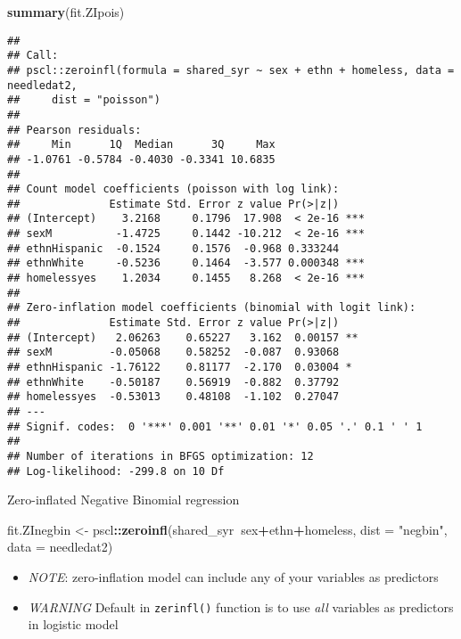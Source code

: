 \documentclass[
  ignorenonframetext,
]{beamer}
\newenvironment{Shaded}{\begin{snugshade}}{\end{snugshade}}
\newcommand{\DataTypeTok}[1]{\textcolor[rgb]{0.13,0.29,0.53}{#1}}
\newcommand{\KeywordTok}[1]{\textcolor[rgb]{0.13,0.29,0.53}{\textbf{#1}}}
\newcommand{\NormalTok}[1]{#1}
\newcommand{\OperatorTok}[1]{\textcolor[rgb]{0.81,0.36,0.00}{\textbf{#1}}}
\newcommand{\StringTok}[1]{\textcolor[rgb]{0.31,0.60,0.02}{#1}}
\providecommand{\tightlist}{%
  \setlength{\itemsep}{0pt}\setlength{\parskip}{0pt}}
\begin{document}
\begin{frame}[fragile]{}
\protect\hypertarget{section-1}{}

\tiny

\begin{Shaded}
\begin{Highlighting}[]
\KeywordTok{summary}\NormalTok{(fit.ZIpois)}
\end{Highlighting}
\end{Shaded}

\begin{verbatim}
## 
## Call:
## pscl::zeroinfl(formula = shared_syr ~ sex + ethn + homeless, data = needledat2, 
##     dist = "poisson")
## 
## Pearson residuals:
##     Min      1Q  Median      3Q     Max 
## -1.0761 -0.5784 -0.4030 -0.3341 10.6835 
## 
## Count model coefficients (poisson with log link):
##              Estimate Std. Error z value Pr(>|z|)    
## (Intercept)    3.2168     0.1796  17.908  < 2e-16 ***
## sexM          -1.4725     0.1442 -10.212  < 2e-16 ***
## ethnHispanic  -0.1524     0.1576  -0.968 0.333244    
## ethnWhite     -0.5236     0.1464  -3.577 0.000348 ***
## homelessyes    1.2034     0.1455   8.268  < 2e-16 ***
## 
## Zero-inflation model coefficients (binomial with logit link):
##              Estimate Std. Error z value Pr(>|z|)   
## (Intercept)   2.06263    0.65227   3.162  0.00157 **
## sexM         -0.05068    0.58252  -0.087  0.93068   
## ethnHispanic -1.76122    0.81177  -2.170  0.03004 * 
## ethnWhite    -0.50187    0.56919  -0.882  0.37792   
## homelessyes  -0.53013    0.48108  -1.102  0.27047   
## ---
## Signif. codes:  0 '***' 0.001 '**' 0.01 '*' 0.05 '.' 0.1 ' ' 1 
## 
## Number of iterations in BFGS optimization: 12 
## Log-likelihood: -299.8 on 10 Df
\end{verbatim}

\end{frame}

\begin{frame}[fragile]{Zero-inflated Negative Binomial regression}
\protect\hypertarget{zero-inflated-negative-binomial-regression}{}

\begin{Shaded}
\begin{Highlighting}[]
\NormalTok{fit.ZInegbin <-}\StringTok{ }
\StringTok{  }\NormalTok{pscl}\OperatorTok{::}\KeywordTok{zeroinfl}\NormalTok{(shared_syr}\OperatorTok{~}\NormalTok{sex}\OperatorTok{+}\NormalTok{ethn}\OperatorTok{+}\NormalTok{homeless,}
                         \DataTypeTok{dist =} \StringTok{"negbin"}\NormalTok{,}
                         \DataTypeTok{data =}\NormalTok{ needledat2)}
\end{Highlighting}
\end{Shaded}

\begin{itemize}
\tightlist
\item
  \emph{NOTE}: zero-inflation model can include any of your variables as
  predictors
\item
  \emph{WARNING} Default in \texttt{zerinfl()} function is to use
  \emph{all} variables as predictors in logistic model
\end{itemize}

\end{frame}
\end{document}
